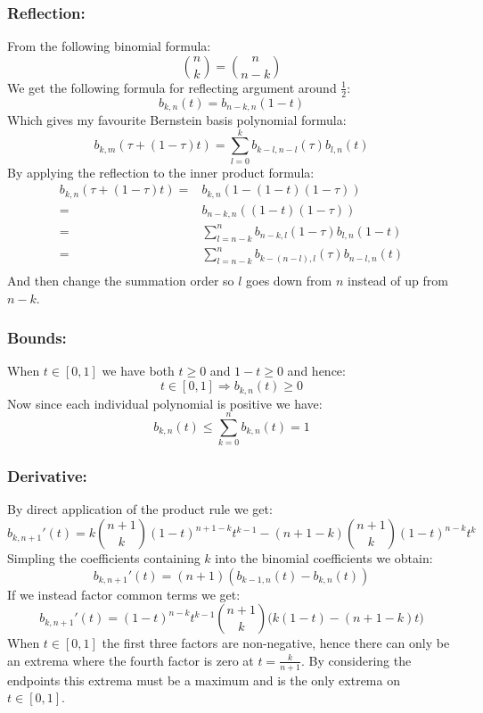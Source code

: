 \subsubsection{Reflection:}
From the following binomial formula:
\[\binom{n}{k}=\binom{n}{n-k}\]
We get the following formula for reflecting argument around $\frac{1}{2}$:
\[b_{k,n}(t) = b_{n-k,n}(1-t)\]
Which gives my favourite Bernstein basis polynomial formula: 
\[ b_{k,m}(\tau+(1-\tau)t) = \sum_{l=0}^kb_{k-l,n-l}(\tau)b_{l,n}(t) \]
By applying the reflection to the inner product formula:
\[\begin{aligned}
	b_{k,n}(\tau+(1-\tau)t) =& b_{k,n}(1-(1-t)(1-\tau))\\
	=& b_{n-k,n}((1-t)(1-\tau))\\
	=&\sum_{l=n-k}^nb_{n-k,l}(1-\tau)b_{l,n}(1-t)\\
	=&\sum_{l=n-k}^nb_{k-(n-l),l}(\tau)b_{n-l,n}(t)\\
\end{aligned}\]
And then change the summation order so $l$ goes down from $n$ instead of up from $n-k$.

\subsubsection{Bounds:}
When $t\in[0,1]$ we have both $t\geq0$ and $1-t\geq0$ and hence:
\[t\in [0,1] \Rightarrow b_{k,n}(t)\geq0 \]
Now since each individual polynomial is positive we have:
\[b_{k,n}(t) \leq \sum_{k=0}^nb_{k,n}(t) = 1\]

\subsubsection{Derivative:}
By direct application of the product rule we get:
\[b_{k,n+1}'(t) = k\binom{n+1}{k}(1-t)^{n+1-k}t^{k-1}-(n+1-k)\binom{n+1}{k}(1-t)^{n-k}t^k\]
Simpling the coefficients containing $k$ into the binomial coefficients we obtain:
\[b_{k,n+1}'(t) = (n+1)(b_{k-1,n}(t)-b_{k,n}(t))\]
If we instead factor common terms we get:
\[b_{k,n+1}'(t) = (1-t)^{n-k}t^{k-1}\binom{n+1}{k}\bigg(k(1-t)-(n+1-k)t\bigg)\]
When $t\in[0,1]$ the first three factors are non-negative,
hence there can only be an extrema where the fourth factor is zero at $t=\frac{k}{n+1}$.
By considering the endpoints this extrema must be a maximum and is the only extrema on $t\in[0,1]$.
